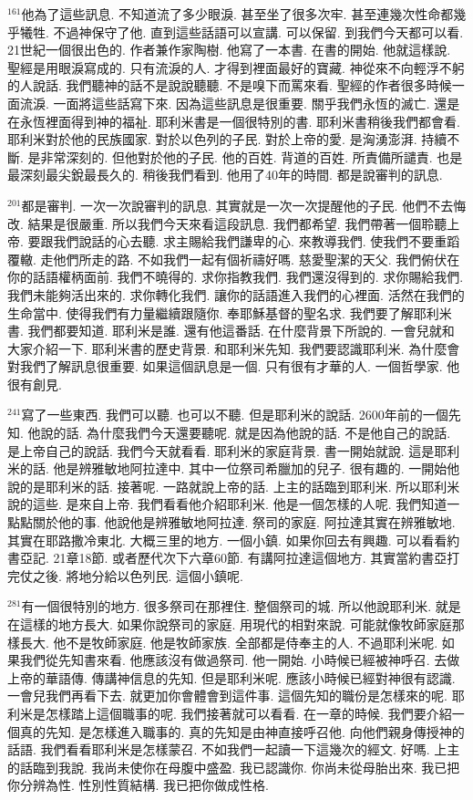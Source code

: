 \documentclass{book}
\begin{document}
$^{161}$他為了這些訊息.
不知道流了多少眼淚.
甚至坐了很多次牢.
甚至連幾次性命都幾乎犧牲.
不過神保守了他.
直到這些話語可以宣講.
可以保留.
到我們今天都可以看.
21世紀一個很出色的.
作者兼作家陶樹.
他寫了一本書.
在書的開始.
他就這樣說.
聖經是用眼淚寫成的.
只有流淚的人.
才得到裡面最好的寶藏.
神從來不向輕浮不躬的人說話.
我們聽神的話不是說說聽聽.
不是嗅下而罵來看.
聖經的作者很多時候一面流淚.
一面將這些話寫下來.
因為這些訊息是很重要.
關乎我們永恆的滅亡.
還是在永恆裡面得到神的福祉.
耶利米書是一個很特別的書.
耶利米書稍後我們都會看.
耶利米對於他的民族國家.
對於以色列的子民.
對於上帝的愛.
是洶湧澎湃.
持續不斷.
是非常深刻的.
但他對於他的子民.
他的百姓.
背道的百姓.
所責備所譴責.
也是最深刻最尖銳最長久的.
稍後我們看到.
他用了40年的時間.
都是說審判的訊息.

$^{201}$都是審判.
一次一次說審判的訊息.
其實就是一次一次提醒他的子民.
他們不去悔改.
結果是很嚴重.
所以我們今天來看這段訊息.
我們都希望.
我們帶著一個聆聽上帝.
要跟我們說話的心去聽.
求主賜給我們謙卑的心.
來教導我們.
使我們不要重蹈覆轍.
走他們所走的路.
不如我們一起有個祈禱好嗎.
慈愛聖潔的天父.
我們俯伏在你的話語權柄面前.
我們不曉得的.
求你指教我們.
我們還沒得到的.
求你賜給我們.
我們未能夠活出來的.
求你轉化我們.
讓你的話語進入我們的心裡面.
活然在我們的生命當中.
使得我們有力量繼續跟隨你.
奉耶穌基督的聖名求.
我們要了解耶利米書.
我們都要知道.
耶利米是誰.
還有他這番話.
在什麼背景下所說的.
一會兒就和大家介紹一下.
耶利米書的歷史背景.
和耶利米先知.
我們要認識耶利米.
為什麼會對我們了解訊息很重要.
如果這個訊息是一個.
只有很有才華的人.
一個哲學家.
他很有創見.

$^{241}$寫了一些東西.
我們可以聽.
也可以不聽.
但是耶利米的說話.
2600年前的一個先知.
他說的話.
為什麼我們今天還要聽呢.
就是因為他說的話.
不是他自己的說話.
是上帝自己的說話.
我們今天就看看.
耶利米的家庭背景.
書一開始就說.
這是耶利米的話.
他是辨雅敏地阿拉達中.
其中一位祭司希臘加的兒子.
很有趣的.
一開始他說的是耶利米的話.
接著呢.
一路就說上帝的話.
上主的話臨到耶利米.
所以耶利米說的這些.
是來自上帝.
我們看看他介紹耶利米.
他是一個怎樣的人呢.
我們知道一點點關於他的事.
他說他是辨雅敏地阿拉達.
祭司的家庭.
阿拉達其實在辨雅敏地.
其實在耶路撒冷東北.
大概三里的地方.
一個小鎮.
如果你回去有興趣.
可以看看約書亞記.
21章18節.
或者歷代次下六章60節.
有講阿拉達這個地方.
其實當約書亞打完仗之後.
將地分給以色列民.
這個小鎮呢.

$^{281}$有一個很特別的地方.
很多祭司在那裡住.
整個祭司的城.
所以他說耶利米.
就是在這樣的地方長大.
如果你說祭司的家庭.
用現代的相對來說.
可能就像牧師家庭那樣長大.
他不是牧師家庭.
他是牧師家族.
全部都是侍奉主的人.
不過耶利米呢.
如果我們從先知書來看.
他應該沒有做過祭司.
他一開始.
小時候已經被神呼召.
去做上帝的華語傳.
傳講神信息的先知.
但是耶利米呢.
應該小時候已經對神很有認識.
一會兒我們再看下去.
就更加你會體會到這件事.
這個先知的職份是怎樣來的呢.
耶利米是怎樣踏上這個職事的呢.
我們接著就可以看看.
在一章的時候.
我們要介紹一個真的先知.
是怎樣進入職事的.
真的先知是由神直接呼召他.
向他們親身傳授神的話語.
我們看看耶利米是怎樣蒙召.
不如我們一起讀一下這幾次的經文.
好嗎.
上主的話臨到我說.
我尚未使你在母腹中盛盈.
我已認識你.
你尚未從母胎出來.
我已把你分辨為性.
性別性質結構.
我已把你做成性格.
\end{document}
